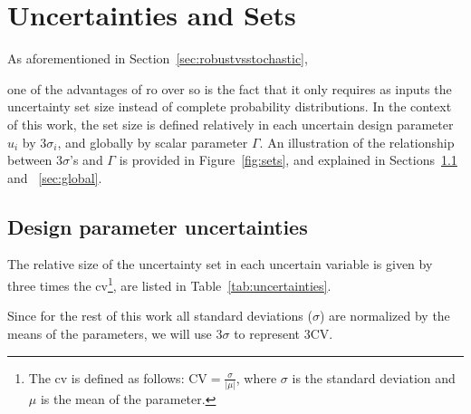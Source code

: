 \section{Uncertainties and Sets}
\label{uncertainties_and_sets}

As aforementioned in Section~\ref{sec:robustvsstochastic}, {\color{blue}one of the advantages
of \gls{ro} over \gls{so} is the fact that it only requires as inputs
the uncertainty set size instead of complete probability distributions.
In the context of this work, the set size is defined relatively in each
uncertain design parameter $u_i$ by $3\sigma_i$, and globally by scalar parameter
$\Gamma$. An illustration of the relationship between $3\sigma$'s and $\Gamma$
is provided in Figure~\ref{fig:sets}, and explained in Sections~\ref{sec:relative} and ~\ref{sec:global}.

\subsection{Design parameter uncertainties}
\label{sec:relative}

The relative size of the uncertainty set in each uncertain variable is
given by three times the \gls{cv}\footnote{The \gls{cv}
is defined as follows: $\text{CV} = \frac{\sigma}{|\mu|}$,
where $\sigma$ is the standard deviation and $\mu$ is the mean of the parameter.},
are listed in Table~\ref{tab:uncertainties}.} Since for the rest of this work
all standard deviations ($\sigma$) are normalized by the means of the parameters, we will use $3\sigma$
to represent $3\text{CV}$.

